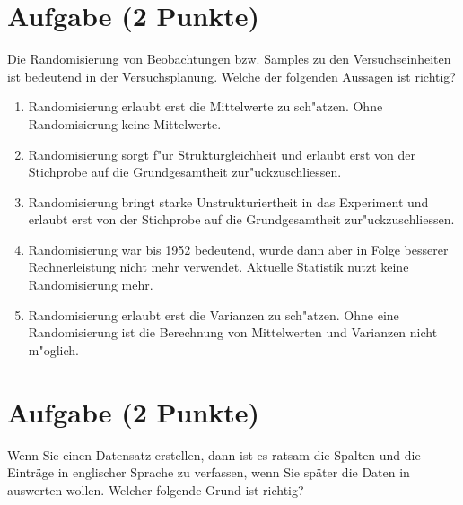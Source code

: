 \documentclass[a4paper, 9pt]{scrartcl}\usepackage[]{graphicx}\usepackage[]{xcolor}
\begin{document}
\section{Aufgabe \hfill (2 Punkte)}

Die Randomisierung von Beobachtungen bzw. Samples zu den Versuchseinheiten
ist bedeutend in der Versuchsplanung. Welche der folgenden Aussagen ist richtig?



\begin{enumerate}
\item [\textbf{A} \msquare] Randomisierung erlaubt erst die Mittelwerte zu sch{"a}tzen. Ohne Randomisierung keine Mittelwerte.
\item [\textbf{B} \msquare] Randomisierung sorgt f{"u}r Strukturgleichheit und erlaubt erst von der Stichprobe auf die Grundgesamtheit zur{"u}ckzuschliessen.
\item [\textbf{C} \msquare] Randomisierung bringt starke Unstrukturiertheit in das Experiment und erlaubt erst von der Stichprobe auf die Grundgesamtheit zur{"u}ckzuschliessen.
\item [\textbf{D} \msquare] Randomisierung war bis 1952 bedeutend, wurde dann aber in Folge besserer Rechnerleistung nicht mehr verwendet. Aktuelle Statistik nutzt keine Randomisierung mehr.
\item [\textbf{E} \msquare] Randomisierung erlaubt erst die Varianzen zu sch{"a}tzen. Ohne eine Randomisierung ist die Berechnung von Mittelwerten und Varianzen nicht m{"o}glich.
\end{enumerate}

\section{Aufgabe \hfill (2 Punkte)}

Wenn Sie einen Datensatz erstellen, dann ist es ratsam die Spalten und die
Eintr{\"a}ge in englischer Sprache zu verfassen, wenn Sie sp{\"a}ter die Daten in
\Rlogo auswerten wollen. Welcher folgende Grund ist richtig?
\end{document}
